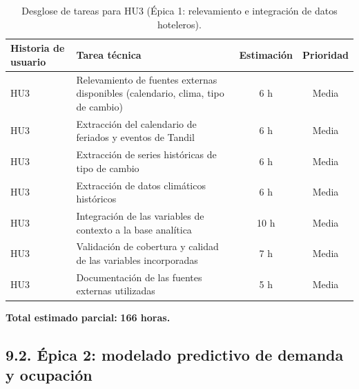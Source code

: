 \documentclass[
11pt, %
]{charter}
\begin{document}
\begin{table}[H]
\centering
\begin{tabularx}{\linewidth}{@{}|X|X|c|c|@{}}
\hline
\rowcolor[HTML]{C0C0C0}
Historia de usuario & Tarea técnica & Estimación & Prioridad \\ \hline
HU3 & Relevamiento de fuentes externas disponibles (calendario, clima, tipo de cambio) & 6 h & Media \\ \hline
HU3 & Extracción del calendario de feriados y eventos de Tandil & 6 h & Media \\ \hline
HU3 & Extracción de series históricas de tipo de cambio & 6 h & Media \\ \hline
HU3 & Extracción de datos climáticos históricos & 6 h & Media \\ \hline
HU3 & Integración de las variables de contexto a la base analítica & 10 h & Media \\ \hline
HU3 & Validación de cobertura y calidad de las variables incorporadas & 7 h & Media \\ \hline
HU3 & Documentación de las fuentes externas utilizadas & 5 h & Media \\ \hline
\end{tabularx}
\caption{Desglose de tareas para HU3 (Épica 1: relevamiento e integración de datos hoteleros).}
\end{table}
 
\noindent
\textbf{Total estimado parcial:} \textbf{166 horas.}

\subsection*{9.2. Épica 2: modelado predictivo de demanda y ocupación}
 
\end{document}

